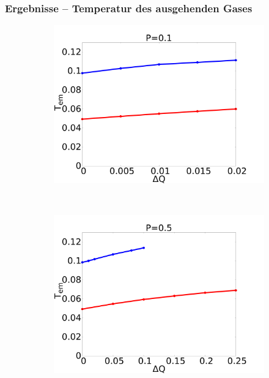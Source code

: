 \documentclass[handout]{beamer}
\begin{document}
\begin{frame}
\frametitle{Ergebnisse -- Temperatur des ausgehenden Gases}
\begin{figure}
    \begin{center}
        \begin{subfigure}[t]{0.3\textwidth}
            \includegraphics[scale=0.11]{../images/p01_out.pdf}
        \end{subfigure} 
        \
        \begin{subfigure}[t]{0.3\textwidth}
            \includegraphics[scale=0.11]{../images/p05_out.pdf}
        \end{subfigure} 
        \
        \begin{subfigure}[t]{0.3\textwidth}

\end{subfigure}
\end{center}
\end{figure}
\end{frame}
\end{document}
